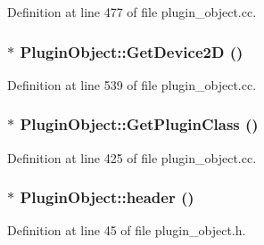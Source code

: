 Definition at line 477 of file plugin\_\-object.cc.

\hypertarget{class_plugin_object_a0678b6675237f65d7679a400759b5c29}{
\subsubsection[{GetDevice2D}]{ $\ast$ PluginObject::GetDevice2D ()}}
\label{class_plugin_object_a0678b6675237f65d7679a400759b5c29}


Definition at line 539 of file plugin\_\-object.cc.

\hypertarget{class_plugin_object_a4b017230102036f1626af06df4864a95}{
\subsubsection[{GetPluginClass}]{ $\ast$ PluginObject::GetPluginClass ()}}
\label{class_plugin_object_a4b017230102036f1626af06df4864a95}


Definition at line 425 of file plugin\_\-object.cc.

\hypertarget{class_plugin_object_ac551056ed0941b76c4161ba71e4cf449}{
\subsubsection[{header}]{$\ast$ PluginObject::header ()}}
\label{class_plugin_object_ac551056ed0941b76c4161ba71e4cf449}


Definition at line 45 of file plugin\_\-object.h.

